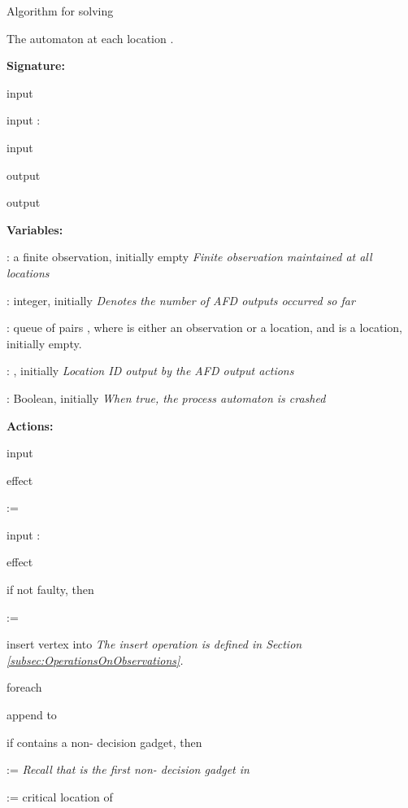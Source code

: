 \documentclass[11pt]{article}
\numberwithin{theorem}{section}
\newcommand{\tab}{\hspace{5mm}}
\begin{document}
\begin{algorithm}\footnotesize
\caption{Algorithm for solving }
\label{alg:exchangeFD}
The automaton  at each location .



\textbf{Signature:}

\tab input 

\tab input : 

\tab input 

\tab output 

\tab output 

\tab 

\textbf{Variables:}

\tab : a finite observation, initially empty \hfill \emph{Finite observation maintained at all locations}

\tab : integer, initially  \hfill \emph{Denotes the number of AFD outputs occurred so far}

\tab : queue of pairs , where  is either an observation or a location, and  is a location, initially empty. 

\tab : , initially  \hfill \emph{Location ID output by the  AFD output actions}

\tab : Boolean, initially  \hfill \emph{When true, the process automaton is crashed}


\tab 


\textbf{Actions:}

\tab input 

\tab effect

\tab \tab  := 

\tab


\tab input : 

\tab effect

\tab \tab if not faulty, then

\tab \tab \tab  :=  



\tab \tab \tab insert vertex  into  \hfill \emph{The insert operation is defined in Section \ref{subsec:OperationsOnObservations}.}

\tab \tab \tab foreach 

\tab \tab \tab \tab append  to 

\tab \tab \tab if  contains a non- decision gadget, then

\tab \tab \tab \tab  :=  \hfill \emph{Recall that  is the first non- decision gadget in }



\tab \tab \tab \tab  := critical location of 


\end{algorithm}
\end{document}
